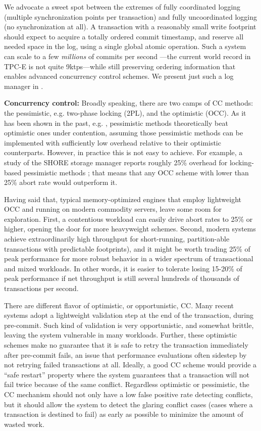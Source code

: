 We advocate a sweet spot between the extremes of fully coordinated logging (multiple synchronization points per transaction) and fully uncoordinated logging (no synchronization at all). A transaction with a reasonably small write footprint should expect to acquire a totally ordered commit timestamp, and reserve all needed space in the log, using a single global atomic operation. Such a system can scale to a few {\em millions} of commits per second \cite{TuZKLM13}---the current world record in TPC-E is not quite 9ktps---while still preserving ordering information that enables advanced concurrency control schemes. We present just such a log manager in .

\vspace{2mm} 
{\bf Concurrency control:} 
Broadly speaking, there are two camps of CC methods: the pessimistic, e.g. two-phase locking (2PL), and the optimistic (OCC). As it has been shown in the past, e.g. \cite{AgrawalCL87}, pessimistic methods theoretically beat optimistic ones under contention, assuming those pessimistic methods can be implemented with sufficiently low overhead relative to their optimistic counterparts. However, in practice this is not easy to achieve. For example, a study of the SHORE storage manager reports roughly 25\% overhead for locking-based pessimistic methods \cite{HarizopoulosAMS08}; that means that any OCC scheme with lower than 25\% abort rate would outperform it.

Having said that, typical memory-optimized engines that employ lightweight OCC and running on modern commodity servers, leave some room for exploration. First, a contentious workload can easily drive abort rates to 25\% or higher, opening the door for more heavyweight schemes. Second, modern systems achieve extraordinarily high throughput for short-running, partition-able transactions with predictable footprints), and it might be worth trading 25\% of peak performance for more robust behavior in a wider spectrum of transactional and mixed workloads. In other words, it is easier to tolerate losing 15-20\% of peak performance if net throughput is still several hundreds of thousands of transactions per second.

There are different flavor of optimistic, or opportunistic, CC. Many recent systems adopt a lightweight validation step at the end of the transaction, during pre-commit. Such kind of validation is very opportunistic, and somewhat brittle, leaving the system vulnerable in many workloads.
Further, these optimistic schemes make no guarantee that it is safe to retry the transaction immediately after pre-commit fails, an issue that performance evaluations often sidestep by not retrying failed transactions at all. Ideally, a good CC scheme would provide a ``safe restart'' property \cite{PortsG12} where the system guarantees that a transaction will not fail twice because of the same conflict.
Regardless optimistic or pessimistic, the CC mechanism should not only have a low false positive rate detecting conflicts, but it should allow the system to detect the glaring conflict cases (cases where a transaction is destined to fail) as early as possible to minimize the amount of wasted work.

